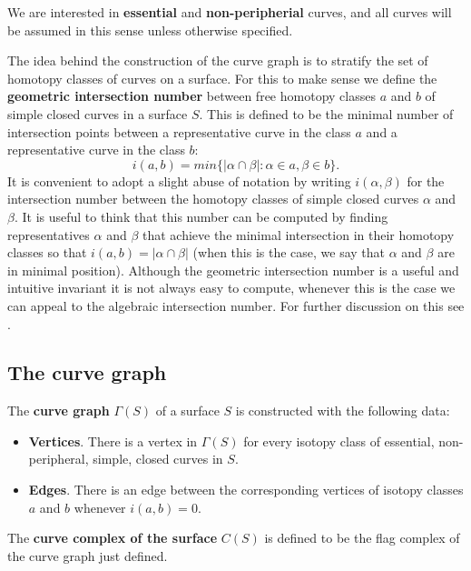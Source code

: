 We are interested in \textbf{essential} and \textbf{non-peripherial} curves, and all curves will be assumed in this sense unless otherwise specified.

The idea behind the construction of the curve graph is to stratify the set of homotopy classes of curves on a surface. For this to make sense we define the \textbf{geometric intersection number} between free homotopy classes $a$ and $b$ of simple closed curves in a surface $S$. This is defined to be the minimal number of intersection points between a representative curve in the class $a$ and a representative curve in the class $b$:
$$i(a,b) = min \{ |\alpha \cap \beta| : \alpha \in a, \beta \in b \}.$$
It is convenient to adopt a slight abuse of notation by writing $i(\alpha, \beta)$ for the intersection number between the homotopy classes of simple closed curves $\alpha$ and $\beta$. It is useful to think that this number can be computed by finding representatives $\alpha$ and $\beta$ that achieve the minimal intersection in their homotopy classes so that $i(a, b) = |\alpha \cap \beta|$ (when this is the case, we say that $\alpha$ and $\beta$ are in minimal position). Although the geometric intersection number is a useful and intuitive invariant it is not always easy to compute, whenever this is the case we can appeal to the algebraic intersection number. For further discussion on this see \cite[Farb]{Farb}.

\subsection{The curve graph}

\begin{defini}
The \textbf{curve graph} $\Gamma(S)$ of a surface $S$ is constructed with the following data:
\begin{itemize}
\item \textbf{Vertices}. There is a vertex in $\Gamma(S)$ for every isotopy class of essential, non-peripheral, simple, closed curves in $S$.
\item \textbf{Edges}. There is an edge between the corresponding vertices of isotopy classes $a$ and $b$ whenever $i(a,b)=0$.
\end{itemize}
\end{defini}

\begin{defini}
The \textbf{curve complex of the surface} $C(S)$ is defined to be the flag complex of the curve graph just defined.
\end{defini}

